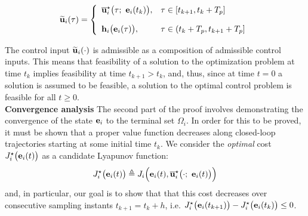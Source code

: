 \begin{equation}
  \widetilde{\bm{\mathbf{u}}}_i(\tau) = \left\{
      \begin{array}{ll}
        \overline{\bm{\mathbf{u}}}_i^{\star}\big(\tau;\ \bm{\mathbf{e}}_i(t_k)\big), & \tau \in [t_{k+1}, t_k + T_p] \\[2.5ex]
        \bm{\mathbf{h}}_i\big(\bm{\mathbf{e}}_i(\tau)\big), & \tau \in (t_k + T_p, t_{k+1} + T_p]
      \end{array}
      \right.
\label{eq:optimal_input_t_plus_one}
\end{equation}

The control input $\widetilde{\bm{\mathbf{u}}}_i(\cdot)$ is admissible as a
composition of admissible control inputs. This means that feasibility of a
solution to the optimization problem at time $t_k$ implies feasibility at
time $t_{k+1} > t_k$, and, thus, since at time $t=0$ a solution is assumed to
be feasible, a solution to the optimal control problem is feasible for all
$t \geq 0$.\\[2.5ex]

\textbf{Convergence analysis}
The second part of the proof involves demonstrating the convergence of the
state $\bm{\mathbf{e}}_i$ to the terminal set $\Omega_i$. In order for this
to be proved, it must be shown that a proper value function decreases along
closed-loop trajectories starting at some initial time $t_k$. We consider the
\textit{optimal} cost $J_i^{\star}\big(\bm{\mathbf{e}}_i(t)\big)$ as a candidate
Lyapunov function:
$$J_i^{\star}\big(\vect{e}_i(t)\big) \triangleq J_i \Big(\vect{e}_i(t), \overline{\vect{u}}_i^{\star}\big(\cdot;\ \vect{e}_i(t)\big)\Big)$$
and, in particular, our goal is to show that that this cost decreases over
consecutive sampling instants $t_{k+1} = t_k + h$, i.e.
$J_i^{\star}\big(\bm{\mathbf{e}}_i(t_{k+1})\big) - J_i^{\star}\big(\bm{\mathbf{e}}_i(t_k)\big) \leq 0$.\\[2.5ex]

